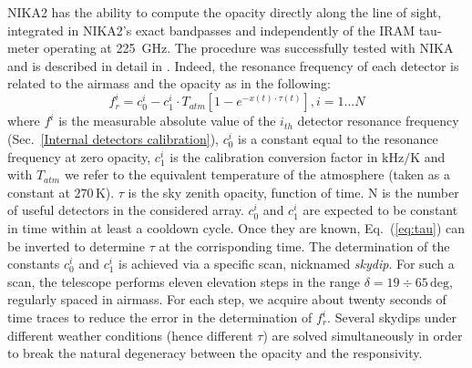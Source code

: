 \documentclass[]{aa} %
\begin{document}
NIKA2 has the ability to compute the opacity directly along the line of sight, integrated in NIKA2's exact bandpasses and independently of the IRAM tau-meter operating at 225~GHz. The procedure was successfully tested with NIKA and is described in detail in \cite{Catalano2014}. Indeed, the resonance frequency of each detector is related to the airmass and the opacity as in the following:
\begin{equation}\label{eq:skydip}
f^{i}_{r} = c^{i}_0 - c^{i}_1 \cdot T_{atm}[1 - e^{- x(t) \cdot \tau (t)}],  i = 1 ... N
\label{eq:tau}
\end{equation}
where $f^{i}$ is the measurable absolute value of the $i_{th}$ detector resonance frequency (Sec.~\ref{Internal detectors calibration}), $c^{i}_0$ is a constant equal to the resonance frequency at zero opacity, $c^{i}_1$ is the calibration conversion factor in $\mathrm{kHz/K}$ and with $T_{atm}$ we refer to the equivalent temperature of the atmosphere (taken as a constant at $270\,\mathrm{K}$). $\tau$ is the sky zenith opacity, function of time. N is the number of useful detectors in the considered array. $c^{i}_0$ and $c^{i}_1$ are expected to be constant in time within at least a cooldown cycle. Once they are known, Eq.~(\ref{eq:tau}) can be inverted to determine $\tau$ at the corrisponding time. The determination of the constants $c^{i}_0$ and $c^{i}_1$ is achieved via a specific scan, nicknamed \emph{skydip}. For such a scan, the telescope performs eleven elevation steps in the range $\delta = 19\div65\,\mathrm{deg}$, regularly spaced in airmass. For each step, we acquire about twenty seconds of time traces to reduce the error in the determination of $f^{i}_{r}$. Several skydips under different weather conditions (hence different $\tau$) are solved simultaneously in order to break the natural degeneracy between the opacity and the responsivity.
\end{document}
